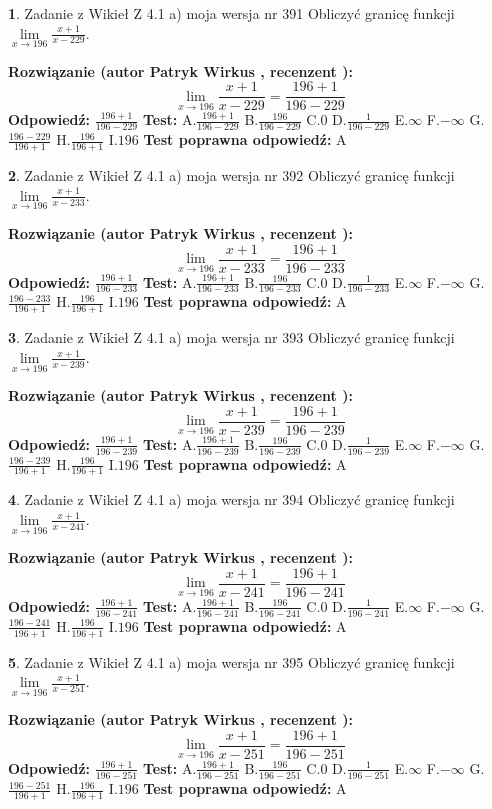 \documentclass[12pt, a4paper]{article}
\theoremstyle{definition} %
\newtheorem{zad}{}
\newcommand{\zadStart}[1]{\begin{zad}#1\newline}
\newcommand{\zadStop}{\end{zad}}
\newcommand{\rozwStart}[2]{\noindent \textbf{Rozwiązanie (autor #1 , recenzent #2): }\newline}
\newcommand{\rozwStop}{\newline}
\newcommand{\odpStart}{\noindent \textbf{Odpowiedź:}\newline}
\newcommand{\odpStop}{\newline}
\newcommand{\testStart}{\noindent \textbf{Test:}\newline}
\newcommand{\testStop}{\newline}
\newcommand{\kluczStart}{\noindent \textbf{Test poprawna odpowiedź:}\newline}
\newcommand{\kluczStop}{\newline}
\begin{document}
\zadStart{Zadanie z Wikieł Z 4.1 a) moja wersja nr 391}
Obliczyć granicę funkcji $\lim\limits_{x\to196}\frac{x+1}{x-229}$.
\zadStop
\rozwStart{Patryk Wirkus}{}
$$\lim\limits_{x\to196}\frac{x+1}{x-229} = \frac{196+1}{196-229}$$
\rozwStop
\odpStart
$\frac{196+1}{196-229}$
\odpStop
\testStart
A.$\frac{196+1}{196-229}$
B.$\frac{196}{196-229}$
C.$0$
D.$\frac{1}{196-229}$
E.$\infty$
F.$-\infty$
G.$\frac{196-229}{196+1}$
H.$\frac{196}{196+1}$
I.$196$
\testStop
\kluczStart
A
\kluczStop



\zadStart{Zadanie z Wikieł Z 4.1 a) moja wersja nr 392}
Obliczyć granicę funkcji $\lim\limits_{x\to196}\frac{x+1}{x-233}$.
\zadStop
\rozwStart{Patryk Wirkus}{}
$$\lim\limits_{x\to196}\frac{x+1}{x-233} = \frac{196+1}{196-233}$$
\rozwStop
\odpStart
$\frac{196+1}{196-233}$
\odpStop
\testStart
A.$\frac{196+1}{196-233}$
B.$\frac{196}{196-233}$
C.$0$
D.$\frac{1}{196-233}$
E.$\infty$
F.$-\infty$
G.$\frac{196-233}{196+1}$
H.$\frac{196}{196+1}$
I.$196$
\testStop
\kluczStart
A
\kluczStop



\zadStart{Zadanie z Wikieł Z 4.1 a) moja wersja nr 393}
Obliczyć granicę funkcji $\lim\limits_{x\to196}\frac{x+1}{x-239}$.
\zadStop
\rozwStart{Patryk Wirkus}{}
$$\lim\limits_{x\to196}\frac{x+1}{x-239} = \frac{196+1}{196-239}$$
\rozwStop
\odpStart
$\frac{196+1}{196-239}$
\odpStop
\testStart
A.$\frac{196+1}{196-239}$
B.$\frac{196}{196-239}$
C.$0$
D.$\frac{1}{196-239}$
E.$\infty$
F.$-\infty$
G.$\frac{196-239}{196+1}$
H.$\frac{196}{196+1}$
I.$196$
\testStop
\kluczStart
A
\kluczStop



\zadStart{Zadanie z Wikieł Z 4.1 a) moja wersja nr 394}
Obliczyć granicę funkcji $\lim\limits_{x\to196}\frac{x+1}{x-241}$.
\zadStop
\rozwStart{Patryk Wirkus}{}
$$\lim\limits_{x\to196}\frac{x+1}{x-241} = \frac{196+1}{196-241}$$
\rozwStop
\odpStart
$\frac{196+1}{196-241}$
\odpStop
\testStart
A.$\frac{196+1}{196-241}$
B.$\frac{196}{196-241}$
C.$0$
D.$\frac{1}{196-241}$
E.$\infty$
F.$-\infty$
G.$\frac{196-241}{196+1}$
H.$\frac{196}{196+1}$
I.$196$
\testStop
\kluczStart
A
\kluczStop



\zadStart{Zadanie z Wikieł Z 4.1 a) moja wersja nr 395}
Obliczyć granicę funkcji $\lim\limits_{x\to196}\frac{x+1}{x-251}$.
\zadStop
\rozwStart{Patryk Wirkus}{}
$$\lim\limits_{x\to196}\frac{x+1}{x-251} = \frac{196+1}{196-251}$$
\rozwStop
\odpStart
$\frac{196+1}{196-251}$
\odpStop
\testStart
A.$\frac{196+1}{196-251}$
B.$\frac{196}{196-251}$
C.$0$
D.$\frac{1}{196-251}$
E.$\infty$
F.$-\infty$
G.$\frac{196-251}{196+1}$
H.$\frac{196}{196+1}$
I.$196$
\testStop
\kluczStart
A
\kluczStop
\end{document}
